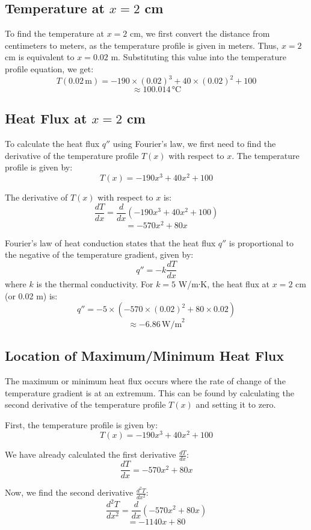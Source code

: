 \documentclass{article}
\begin{document}
\subsection{Temperature at \( x = 2 \) cm}
To find the temperature at \( x = 2 \) cm, we first convert the distance from centimeters to meters, as the temperature profile is given in meters. Thus, \( x = 2 \) cm is equivalent to \( x = 0.02 \) m. Substituting this value into the temperature profile equation, we get:
\[ T(0.02 \, \text{m}) = -190 \times (0.02)^3 + 40 \times (0.02)^2 + 100 \]
\[ \approx 100.014 \, \text{°C} \]

\subsection{Heat Flux at \( x = 2 \) cm}
To calculate the heat flux \( q'' \) using Fourier's law, we first need to find the derivative of the temperature profile \( T(x) \) with respect to \( x \). The temperature profile is given by:
\[ T(x) = -190x^3 + 40x^2 + 100 \]

The derivative of \( T(x) \) with respect to \( x \) is:
\[ \frac{dT}{dx} = \frac{d}{dx}(-190x^3 + 40x^2 + 100) \]
\[ = -570x^2 + 80x \]

Fourier's law of heat conduction states that the heat flux \( q'' \) is proportional to the negative of the temperature gradient, given by:
\[ q'' = -k \frac{dT}{dx} \]
where \( k \) is the thermal conductivity. For \( k = 5 \) W/m∙K, the heat flux at \( x = 2 \) cm (or 0.02 m) is:
\[ q'' = -5 \times (-570 \times (0.02)^2 + 80 \times 0.02) \]
\[ \approx -6.86 \, \text{W/m}^2 \]

\subsection{Location of Maximum/Minimum Heat Flux}
The maximum or minimum heat flux occurs where the rate of change of the temperature gradient is at an extremum. This can be found by calculating the second derivative of the temperature profile \( T(x) \) and setting it to zero.

First, the temperature profile is given by:
\[ T(x) = -190x^3 + 40x^2 + 100 \]

We have already calculated the first derivative \( \frac{dT}{dx} \):
\[ \frac{dT}{dx} = -570x^2 + 80x \]

Now, we find the second derivative \( \frac{d^2T}{dx^2} \):
\[ \frac{d^2T}{dx^2} = \frac{d}{dx}(-570x^2 + 80x) \]
\[ = -1140x + 80 \]
\end{document}
